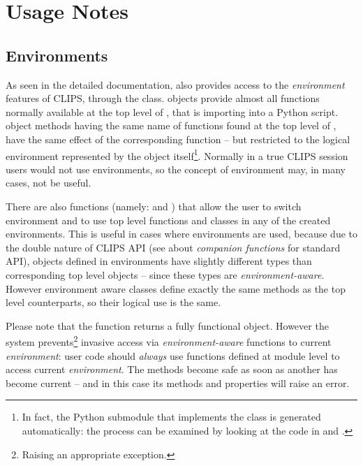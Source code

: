 \appendix

\chapter{Usage Notes}%
\label{pyclips-unotes}

\section{Environments}%
\label{pyclips-unotes-env}

As seen in the detailed documentation, \pyclips{} also provides access
to the \emph{environment} features of CLIPS, through the
 class.  objects provide almost
all functions normally available at the top level of \pyclips{}, that is
importing  into a Python script.  object
methods having the same name of functions found at the top level of
\pyclips{}, have the same effect of the corresponding function -- but
restricted to the logical environment represented by the object
itself\footnote{In fact, the Python submodule that implements the
 class is generated automatically: the process can be
examined by looking at the code in  and
.}. Normally in a true CLIPS session users would
not use environments, so the concept of environment may, in many cases,
not be useful.

There are also functions (namely:  and
) that allow the user to switch
environment and to use top level functions and classes in any of the
created environments. This is useful in cases where environments are used,
because due to the double nature of CLIPS API (see \clipsapg{} about
\emph{companion functions} for standard API), objects defined in
environments have slightly different types than corresponding top level
objects -- since these types are \emph{environment-aware}. However
environment aware classes define exactly the same methods as the top
level counterparts, so their logical use is the same.

\begin{notice}
Please note that the  function returns
a fully functional  object. However the system
prevents\footnote{Raising an appropriate exception.} invasive access via
\emph{environment-aware} functions to current \emph{environment}: user
code should \emph{always} use functions defined at module level to access
current \emph{environment}. The  methods become safe
as soon as another  has become current -- and in this
case its methods and properties will raise an error.
\end{notice}

